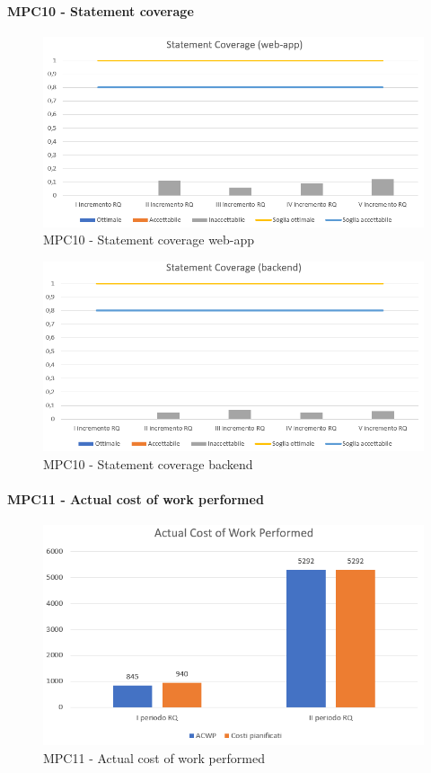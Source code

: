   \clearpage
  \paragraph{MPC10 - Statement coverage}
  \begin{figure}[h!]
    \centering
      \includegraphics[scale=1]{Immagini/StatCov WA.PNG}
    \caption{MPC10 - Statement coverage web-app}
  \end{figure}

  \begin{figure}[h!]
    \centering
      \includegraphics[scale=1]{Immagini/StatCov BE.PNG}
    \caption{MPC10 - Statement coverage backend}
  \end{figure}



  \clearpage
  \paragraph{MPC11 - Actual cost of work performed}
  \begin{figure}[h!]
    \centering
      \includegraphics[scale=1]{Immagini/ACWP.PNG}
    \caption{MPC11 -  Actual cost of work performed}
  \end{figure}



